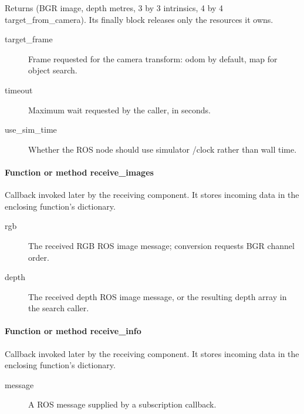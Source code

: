 \documentclass[11pt,a4paper]{book}
\begin{document}
Returns (BGR image, depth metres, 3 by 3 intrinsics, 4 by 4 target\_from\_camera). Its finally block releases only the resources it owns.

\begin{description}
\item[target\_frame] Frame requested for the camera transform: odom by default, map for object search.
\item[timeout] Maximum wait requested by the caller, in seconds.
\item[use\_sim\_time] Whether the ROS node should use simulator /clock rather than wall time.
\end{description}

\paragraph{Function or method receive\_images}
Callback invoked later by the receiving component. It stores incoming data in the enclosing function's dictionary.

\begin{description}
\item[rgb] The received RGB ROS image message; conversion requests BGR channel order.
\item[depth] The received depth ROS image message, or the resulting depth array in the search caller.
\end{description}

\paragraph{Function or method receive\_info}
Callback invoked later by the receiving component. It stores incoming data in the enclosing function's dictionary.

\begin{description}
\item[message] A ROS message supplied by a subscription callback.
\end{description}
\end{document}
